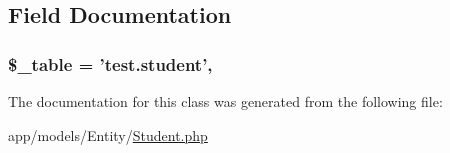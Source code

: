 \subsection{Field Documentation}
\hypertarget{class_entity_1_1_student_ac0ee5b766d19cb282552a3449a1f8376}{
\subsubsection[{\$\-\_\-table}]{\setlength{\rightskip}{0pt plus 5cm}\$\-\_\-table = 'test.\-student'\hspace{0.3cm}{\ttfamily [static]}, {\ttfamily [protected]}}}\label{class_entity_1_1_student_ac0ee5b766d19cb282552a3449a1f8376}


The documentation for this class was generated from the following file\-:\begin{DoxyCompactItemize}
\item 
app/models/\-Entity/\hyperlink{_student_8php}{Student.\-php}\end{DoxyCompactItemize}
